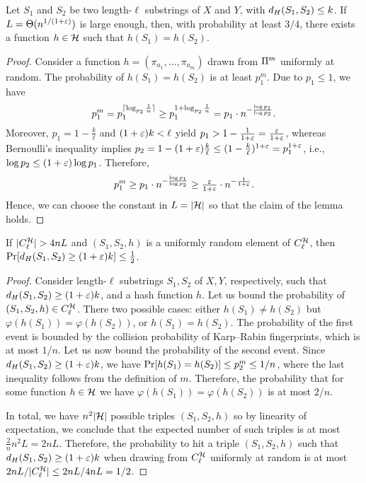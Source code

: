 \begin{lemma}\label{lm:hash_function_exists}
Let $S_1$ and $S_2$ be two length-$\ell$ substrings of $X$ and $Y$, with $d_H(S_1, S_2) \le k$. 
If $L=\Theta(n^{1/(1+\varepsilon)})$ is large enough, then, with probability at least $3/4$, there exists a function $h\in \mathcal{H}$ such that $h(S_1)=h(S_2)$.
\end{lemma}
\begin{proof}
Consider a function $h=(\pi_{a_1},\ldots,\pi_{a_m})$ drawn from $\Pi^m$ uniformly at random. The probability of $h(S_1)=h(S_2)$ is at least $p_1^m$.
Due to $p_1 \le 1$, we have \[p_1^m = p_1^{\lceil\log_{p_2}\frac1n\rceil} \ge p_1^{1+\log_{p_2}\frac1n}=p_1\cdot n^{-\frac{\log p_1}{\log p_2}}.\]
Moreover, $p_1 = 1-\frac{k}{\ell}$ and $(1+\varepsilon)k < \ell$ yield $p_1 > 1-\frac{1}{1+\varepsilon}=\frac{\varepsilon}{1+\varepsilon}$,
whereas Bernoulli's inequality implies $p_2 = 1-(1+\varepsilon)\frac{k}{\ell} \le (1-\frac{k}{\ell})^{1+\varepsilon}=p_1^{1+\varepsilon}$,
i.e., $\log p_2  \le (1+\varepsilon)\log p_1$.
Therefore, \[p_1^m \ge p_1\cdot n^{-\frac{\log p_1}{\log p_2}}\ge\tfrac{\varepsilon}{1+\varepsilon}\cdot n^{-\frac{1}{1+\varepsilon}}.\]
Hence, we can choose the constant in $L=|\mathcal{H}|$ so that the claim of the lemma holds.
\end{proof}

\begin{lemma}\label{lm:bad_collisions}
If $|C^{\mathcal{H}}_{\ell}| > 4 nL$ and $(S_1,S_2, h)$ is a uniformly random element of $C^{\mathcal{H}}_{\ell}$, then $\mathrm{Pr}[d_H(S_1,S_2) \ge (1+\varepsilon) k] \le \frac12$.
\end{lemma}
\begin{proof}
Consider length-$\ell$ substrings $S_1, S_2$ of $X, Y$, respectively, such that $d_H(S_1, S_2) \ge (1+\varepsilon)k$, and a hash function $h$. Let us bound the probability of $(S_1,S_2, h) \in C^{\mathcal{H}}_{\ell}$. There two possible cases: either $h(S_1) \neq h(S_2)$ but $\varphi(h(S_1)) = \varphi(h(S_2))$, or $h(S_1) = h(S_2)$. The probability of the first event is bounded by the collision probability of Karp--Rabin fingerprints, which is at most $1/n$. Let us now bound the probability of the second event. Since $d_H (S_1,S_2)\ge (1+\varepsilon)k$, we have $\mathrm{Pr} [h (S_1) = h (S_2)] \le p_2^{m} \le 1/n$,  
where the last inequality follows from the definition of $m$. Therefore, the probability that for some function $h \in \mathcal{H}$ we have $\varphi(h(S_1)) = \varphi(h(S_2))$ is at most $2/n$. 

In total, we have $n^2 |\mathcal{H}|$ possible triples $(S_1, S_2 ,h)$ so by linearity of expectation, we conclude that the expected number of such triples is at most $\frac{2}{n} n^2 L =2n L$. Therefore, the probability to hit a triple $(S_1, S_2, h)$ such that $d_H(S_1, S_2) \ge (1+\varepsilon)k$ when drawing from $C^{\mathcal{H}}_{\ell}$ uniformly at random is at most $2nL / |C^{\mathcal{H}}_{\ell}| \le 2nL / 4nL = 1/2$.
\end{proof}

